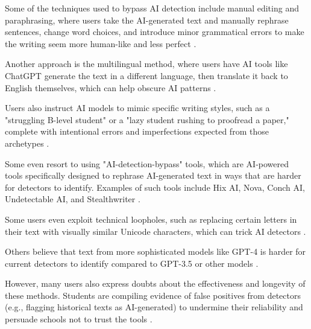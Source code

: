 \documentclass{article}
\begin{document}
Some of the techniques used to bypass AI detection include manual editing and paraphrasing, where users
take the AI-generated text and manually rephrase sentences, change word choices, and introduce minor
grammatical errors to make the writing seem more human-like and less perfect \cite{https://www.reddit.com/r/ChatGPT/comments/139wvn7/how_to_avoid_ai_detection/}
\cite{https://www.reddit.com/r/ChatGPT/comments/18f0u56/to_fool_an_ai_detector/}.

Another approach is the multilingual method, where users have AI tools like ChatGPT generate the text in a different language,
then translate it back to English themselves, which can help obscure AI patterns
\cite{https://www.reddit.com/r/ChatGPT/comments/100jw27/how_you_can_bypass_ai_detection/}.

Users also instruct AI models to mimic specific writing styles, such as a "struggling B-level student"
or a "lazy student rushing to proofread a paper," complete with intentional errors and imperfections
expected from those archetypes \cite{https://www.reddit.com/r/ChatGPTPromptGenius/comments/162anql/is_there_any_free_method_to_bypass_ai_detection/}
\cite{https://www.reddit.com/r/ChatGPT/comments/18f0u56/to_fool_an_ai_detector/}.

Some even resort to using "AI-detection-bypass" tools, which are AI-powered tools specifically designed
to rephrase AI-generated text in ways that are harder for detectors to identify. Examples of such tools
include Hix AI, Nova, Conch AI, Undetectable AI, and Stealthwriter
\cite{https://www.reddit.com/r/ChatGPT/comments/139wvn7/how_to_avoid_ai_detection/}
\cite{https://www.reddit.com/r/ChatGPTPromptGenius/comments/162anql/is_there_any_free_method_to_bypass_ai_detection/}
\cite{https://www.reddit.com/r/OpenAI/comments/zmglvv/how_to_outsmart_and_bypass_ai_content_detection/}.

Some users even exploit technical loopholes, such as replacing certain letters in their text with visually
similar Unicode characters, which can trick AI detectors
\cite{https://www.reddit.com/r/OpenAI/comments/122wlot/the_best_way_to_bypass_ai_detectors/}.

Others believe that text from more sophisticated models like GPT-4 is harder for current detectors
to identify compared to GPT-3.5 or other models \cite{https://www.reddit.com/r/ChatGPT/comments/100jw27/how_you_can_bypass_ai_detection/}.

However, many users also express doubts about the effectiveness and longevity of these methods.
Students are compiling evidence of false positives from detectors (e.g., flagging historical texts as AI-generated)
to undermine their reliability and persuade schools not to trust the tools \cite{https://www.reddit.com/r/ChatGPT/comments/18f0u56/to_fool_an_ai_detector/}
\cite{https://www.reddit.com/r/OpenAI/comments/122wlot/the_best_way_to_bypass_ai_detectors/}.
\end{document}
